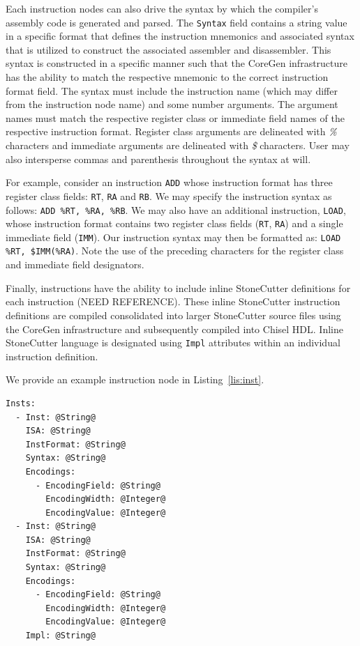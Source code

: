 \documentclass{article}
\begin{document}
Each instruction nodes can also drive the syntax by which the compiler's assembly code is generated and parsed.  The 
\texttt{Syntax} field contains a string value in a specific format that defines the instruction mnemonics and associated 
syntax that is utilized to construct the associated assembler and disassembler.  This syntax is constructed in a specific 
manner such that the CoreGen infrastructure has the ability to match the respective mnemonic to the correct instruction 
format field.  The syntax must include the instruction name (which may differ from the instruction node name) and some 
number arguments.  The argument names must match the respective register class or immediate field names 
of the respective instruction format.  Register class arguments are delineated with \textit{\%} characters and immediate 
arguments are delineated with \textit{\$} characters.  User may also intersperse commas and parenthesis throughout the syntax at will.

For example, consider an instruction \texttt{ADD} whose instruction format has three register class fields: \texttt{RT}, \texttt{RA} and 
\texttt{RB}.  We may specify the instruction syntax as follows: \texttt{ADD \%RT, \%RA, \%RB}.  We may also have an additional 
instruction, \texttt{LOAD}, whose instruction format contains two register class fields (\texttt{RT}, \texttt{RA}) and a single immediate 
field (\texttt{IMM}).  Our instruction syntax may then be formatted as: \texttt{LOAD \%RT, \$IMM(\%RA)}.  Note the use of the preceding 
characters for the register class and immediate field designators.    

Finally, instructions have the ability to include inline StoneCutter definitions for each instruction (NEED REFERENCE).  These 
inline StoneCutter instruction definitions are compiled consolidated into larger StoneCutter source files using the CoreGen 
infrastructure and subsequently compiled into Chisel HDL.  Inline StoneCutter language is designated using \texttt{Impl} 
attributes within an individual instruction definition.   

We provide an example instruction node in Listing~\ref{lis:inst}.     
\clearpage
\vspace{0.125in}
\begin{lstlisting}[frame=single,style=base,caption={Instruction Node Definition},captionpos=b,label={lis:inst}]
Insts:
  - Inst: @String@
    ISA: @String@
    InstFormat: @String@
    Syntax: @String@
    Encodings:
      - EncodingField: @String@
        EncodingWidth: @Integer@
        EncodingValue: @Integer@
  - Inst: @String@
    ISA: @String@
    InstFormat: @String@
    Syntax: @String@
    Encodings:
      - EncodingField: @String@
        EncodingWidth: @Integer@
        EncodingValue: @Integer@
    Impl: @String@
\end{lstlisting}
\end{document}
